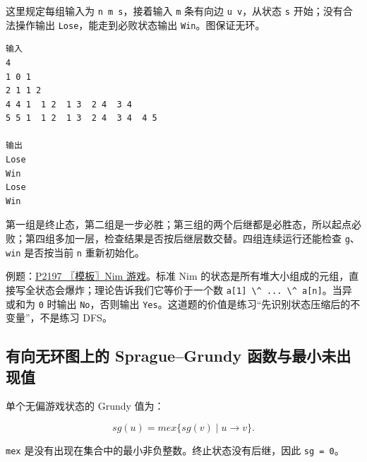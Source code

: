 这里规定每组输入为 \passthrough{\lstinline!n m s!}，接着输入 \passthrough{\lstinline!m!} 条有向边 \passthrough{\lstinline!u v!}，从状态 \passthrough{\lstinline!s!} 开始；没有合法操作输出 \passthrough{\lstinline!Lose!}，能走到必败状态输出 \passthrough{\lstinline!Win!}。图保证无环。

\begin{lstlisting}
输入
4
1 0 1
2 1 1 2
4 4 1  1 2  1 3  2 4  3 4
5 5 1  1 2  1 3  2 4  3 4  4 5

输出
Lose
Win
Lose
Win
\end{lstlisting}

第一组是终止态，第二组是一步必胜；第三组的两个后继都是必胜态，所以起点必败；第四组多加一层，检查结果是否按后继层数交替。四组连续运行还能检查 \passthrough{\lstinline!g!}、\passthrough{\lstinline!win!} 是否按当前 \passthrough{\lstinline!n!} 重新初始化。

例题：\href{https://www.luogu.com.cn/problem/P2197}{P2197 〖模板〗Nim 游戏}。标准 Nim 的状态是所有堆大小组成的元组，直接写全状态会爆炸；理论告诉我们它等价于一个数 \passthrough{\lstinline!a[1] \^ ... \^ a[n]!}。当异或和为 \passthrough{\lstinline!0!} 时输出 \passthrough{\lstinline!No!}，否则输出 \passthrough{\lstinline!Yes!}。这道题的价值是练习``先识别状态压缩后的不变量''，不是练习 DFS。


\subsection{有向无环图上的 Sprague--Grundy 函数与最小未出现值}

单个无偏游戏状态的 Grundy 值为：

\[sg(u)=mex\{sg(v)\mid u\to v\}.\]

\passthrough{\lstinline!mex!} 是没有出现在集合中的最小非负整数。终止状态没有后继，因此 \passthrough{\lstinline!sg = 0!}。

